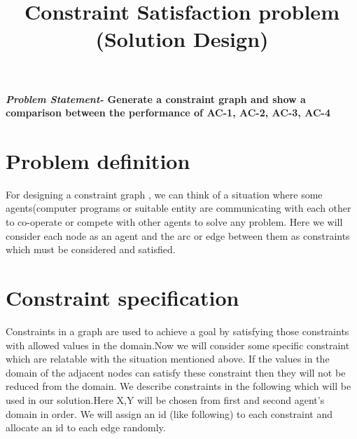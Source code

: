 \documentclass[conference]{IEEEtran}
\begin{document}
\title{\textbf{\LARGE Constraint Satisfaction problem (Solution Design)
}\\
}
\author{
}
\maketitle


\textbf{\textit{Problem Statement-}
Generate a constraint graph and show a comparison between the performance of AC-1, AC-2, AC-3, AC-4 
}




\section{Problem definition}

For designing a constraint graph , we can think of a situation where some agents(computer programs or suitable entity are communicating with each other to co-operate or compete with other agents to solve any problem. Here we will consider each node as an agent and the arc or edge between them as constraints which must be considered and satisfied.


\section{Constraint specification}
Constraints in a graph are used to achieve a goal by satisfying  those constraints with allowed values in the domain.Now we will consider some specific constraint which are relatable with the situation mentioned above. If the values in the domain of the adjacent nodes can satisfy these constraint then they will not be reduced from the domain. We describe constraints in the following which will be used in our solution.Here X,Y will be chosen from first and second agent's domain in order. We will assign an id (like following) to each constraint and allocate an id to each edge randomly.
\\ 
\end{document}
